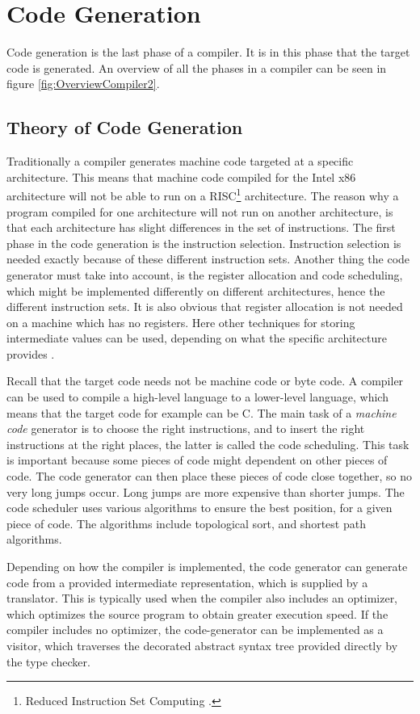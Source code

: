 \section{Code Generation}
\label{sec:theorycodegeneration}
Code generation is the last phase of a compiler. It is in this phase that the target code is generated. An overview of all the phases in a compiler can be seen in figure \ref{fig:OverviewCompiler2}.

\subsection{Theory of Code Generation}
Traditionally a compiler generates machine code targeted at a specific architecture. This means that machine code compiled for the Intel x86 architecture will not be able to run on a RISC\footnote{Reduced Instruction Set Computing \citep{CraftingACompiler}.} architecture. The reason why a program compiled for one architecture will not run on another architecture, is that each architecture has slight differences in the set of instructions. The first phase in the code generation is the instruction selection. Instruction selection is needed exactly because of these different instruction sets. Another thing the code generator must take into account, is the register allocation and code scheduling, which might be implemented differently on different architectures, hence the different instruction sets. It is also obvious that register allocation is not needed on a machine which has no registers. Here other techniques for storing intermediate values can be used, depending on what the specific architecture provides \citep{CraftingACompiler}.

Recall that the target code needs not be machine code or byte code. A compiler can be used to compile a high-level language to a lower-level language, which means that the target code for example can be C. The main task of a \emph{machine code} generator is to choose the right instructions, and to insert the right instructions at the right places, the latter is called the code scheduling. This task is important because some pieces of code might dependent on other pieces of code. The code generator can then place these pieces of code close together, so no very long jumps occur. Long jumps are more expensive than shorter jumps. The code scheduler uses various algorithms to ensure the best position, for a given piece of code. The algorithms include topological sort, and shortest path algorithms.

Depending on how the compiler is implemented, the code generator can generate code from a provided intermediate representation, which is supplied by a translator. This is typically used when the compiler also includes an optimizer, which optimizes the source program to obtain greater execution speed. If the compiler includes no optimizer, the code-generator can be implemented as a visitor, which traverses the decorated abstract syntax tree provided directly by the type checker.